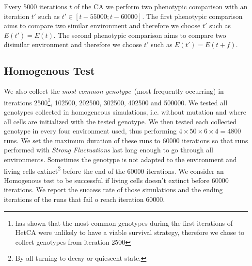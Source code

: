 Every 5000 iterations $t$ of the CA we perform two phenotypic comparison with an iteration $t'$ such as $t'\in[t-55000;t-60000]$. The first phenotypic comparison aims to compare two similar environment and therefore we choose $t'$ such as $E(t')=E(t)$. The second phenotypic comparison aims to compare two disimilar environment and therefore we choose $t'$ such as $E(t')=E(t+f)$.  

\subsection{Homogenous Test}
We also collect the \emph{most common genotype}~(most frequently occurring) in iterations 2500\footnote{\citep{medernach2015evolutionary}  has shown that the most common genotypes during the first iterations of HetCA were unlikely to have a viable survival strategy, therefore we chose to collect genotypes from iteration 2500}, 102500, 202500, 302500, 402500 and 500000. We tested all genotypes collected in homogeneous simulations, i.e. without mutation and where all cells are initialized with the tested genotype. We then tested each collected genotype in every four environment used, thus performing $4\times50\times6\times4=4800$ runs. We set the maximum duration of these runs to 60000 iterations so that runs performed with \emph{Strong Fluctuations} last long enough to go through all environments. Sometimes the genotype is not adapted to the environment and living cells extinct\footnote{By all turning to decay or quiescent state.} before the end of the 60000 iterations. We consider an Homogenous test to be successful if living cells doesn't extinct before 60000 iterations. We report the success rate of those simulations and the ending iterations of the runs that fail o reach iteration 60000. 

